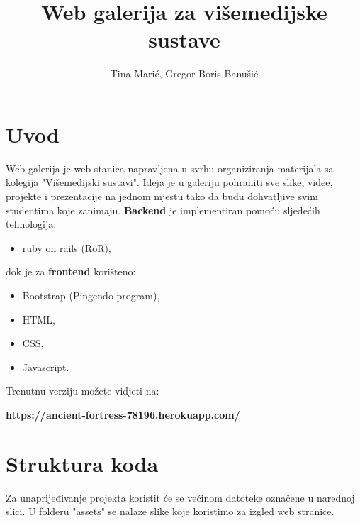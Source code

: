 \documentclass[]{article}
\title{Web galerija za višemedijske sustave}
\author{Tina Marić, Gregor Boris Banušić}
\begin{document}
\maketitle


\section{Uvod}
Web galerija je web stanica napravljena u svrhu organiziranja materijala sa kolegija "Višemedijski sustavi".
Ideja je u galeriju pohraniti sve slike, videe, projekte i prezentacije na jednom mjestu tako da budu dohvatljive svim studentima koje zanimaju. 
\newline
\newline
\textbf{Backend} je implementiran pomoću sljedećih tehnologija:
\begin{itemize}
	\item ruby on rails (RoR),
\end{itemize}
dok je za \textbf{frontend} korišteno:
\begin{itemize}
	\item Bootstrap (Pingendo program),
	\item HTML,
	\item CSS,
	\item Javascript.
\end{itemize}

Trenutnu verziju možete vidjeti na:

\textbf{https://ancient-fortress-78196.herokuapp.com/}

\newpage

\section{Struktura koda}
Za unaprijeđivanje projekta koristit će se većinom datoteke označene u narednoj slici. U folderu "assets" se nalaze slike koje koristimo za izgled web stranice.
\end{document}
